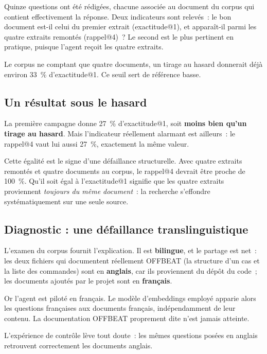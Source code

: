 \documentclass[12pt,a4paper,french]{report}
\begin{document}
Quinze questions ont été rédigées, chacune associée au document du corpus qui
contient effectivement la réponse. Deux indicateurs sont relevés~: le bon
document est-il celui du premier extrait (exactitude@1), et apparaît-il parmi
les quatre extraits remontés (rappel@4)~? Le second est le plus pertinent en
pratique, puisque l'agent reçoit les quatre extraits.

Le corpus ne comptant que quatre documents, un tirage au hasard donnerait déjà
environ \SI{33}{\percent} d'exactitude@1. Ce seuil sert de référence basse.

\subsection{Un résultat sous le hasard}

La première campagne donne \SI{27}{\percent} d'exactitude@1, soit
\textbf{moins bien qu'un tirage au hasard}. Mais l'indicateur réellement
alarmant est ailleurs~: le rappel@4 vaut lui aussi \SI{27}{\percent}, exactement
la même valeur.

Cette égalité est le signe d'une défaillance structurelle. Avec quatre extraits
remontés et quatre documents au corpus, le rappel@4 devrait être proche de
\SI{100}{\percent}. Qu'il soit égal à l'exactitude@1 signifie que les quatre
extraits proviennent \emph{toujours du même document}~: la recherche s'effondre
systématiquement sur une seule source.

\subsection{Diagnostic : une défaillance translinguistique}

L'examen du corpus fournit l'explication. Il est \textbf{bilingue}, et le
partage est net~: les deux fichiers qui documentent réellement OFFBEAT (la
structure d'un cas et la liste des commandes) sont en \textbf{anglais}, car ils
proviennent du dépôt du code~; les documents ajoutés par le projet sont en
\textbf{français}.

Or l'agent est piloté en français. Le modèle d'embeddings employé apparie alors
les questions françaises aux documents français, indépendamment de leur
contenu. La documentation OFFBEAT proprement dite n'est jamais atteinte.

L'expérience de contrôle lève tout doute~: les mêmes questions posées en anglais
retrouvent correctement les documents anglais.
\end{document}
